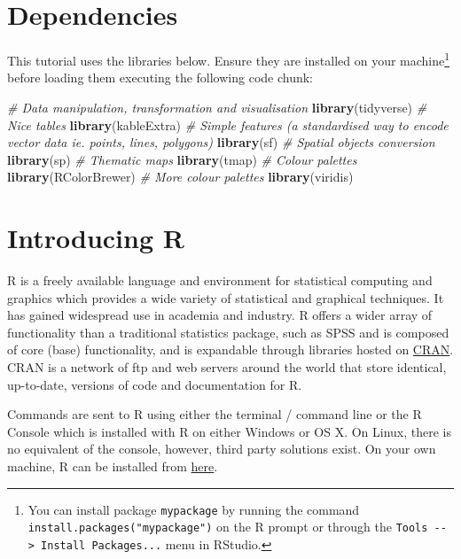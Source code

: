 \documentclass[
]{book}
\newenvironment{Shaded}{\begin{snugshade}}{\end{snugshade}}
\newcommand{\CommentTok}[1]{\textcolor[rgb]{0.56,0.35,0.01}{\textit{#1}}}
\newcommand{\KeywordTok}[1]{\textcolor[rgb]{0.13,0.29,0.53}{\textbf{#1}}}
\newcommand{\NormalTok}[1]{#1}
\begin{document}
\hypertarget{dependencies}{%
\section{Dependencies}\label{dependencies}}

This tutorial uses the libraries below. Ensure they are installed on your machine\footnote{You can install package \texttt{mypackage} by running the command \texttt{install.packages("mypackage")} on the R prompt or through the \texttt{Tools\ -\/-\textgreater{}\ Install\ Packages...} menu in RStudio.} before loading them executing the following code chunk:

\begin{Shaded}
\begin{Highlighting}[]
\CommentTok{# Data manipulation, transformation and visualisation}
\KeywordTok{library}\NormalTok{(tidyverse)}
\CommentTok{# Nice tables}
\KeywordTok{library}\NormalTok{(kableExtra)}
\CommentTok{# Simple features (a standardised way to encode vector data ie. points, lines, polygons)}
\KeywordTok{library}\NormalTok{(sf) }
\CommentTok{# Spatial objects conversion}
\KeywordTok{library}\NormalTok{(sp) }
\CommentTok{# Thematic maps}
\KeywordTok{library}\NormalTok{(tmap) }
\CommentTok{# Colour palettes}
\KeywordTok{library}\NormalTok{(RColorBrewer) }
\CommentTok{# More colour palettes}
\KeywordTok{library}\NormalTok{(viridis)}
\end{Highlighting}
\end{Shaded}

\hypertarget{introducing-r}{%
\section{Introducing R}\label{introducing-r}}

R is a freely available language and environment for statistical computing and graphics which provides a wide variety of statistical and graphical techniques. It has gained widespread use in academia and industry. R offers a wider array of functionality than a traditional statistics package, such as SPSS and is composed of core (base) functionality, and is expandable through libraries hosted on \href{https://cran.r-project.org}{CRAN}. CRAN is a network of ftp and web servers around the world that store identical, up-to-date, versions of code and documentation for R.

Commands are sent to R using either the terminal / command line or the R Console which is installed with R on either Windows or OS X. On Linux, there is no equivalent of the console, however, third party solutions exist. On your own machine, R can be installed from \href{https://www.r-project.org/}{here}.
\end{document}

